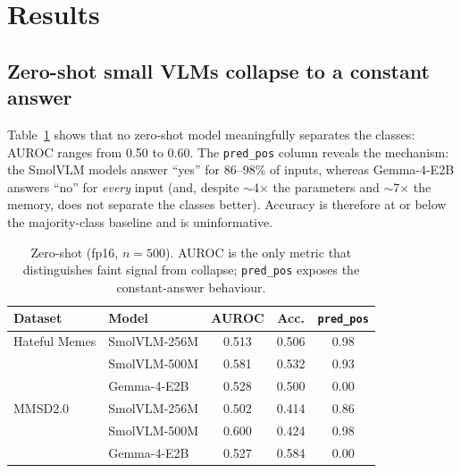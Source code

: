 \documentclass[sigconf,nonacm]{acmart}
\begin{document}
\section{Results}

\subsection{Zero-shot small VLMs collapse to a constant answer}
Table~\ref{tab:zs} shows that no zero-shot model meaningfully separates the classes:
AUROC ranges from 0.50 to 0.60. The \texttt{pred\_pos} column reveals the mechanism:
the SmolVLM models answer ``yes'' for 86--98\% of inputs, whereas Gemma-4-E2B answers
``no'' for \emph{every} input (and, despite $\sim$4$\times$ the parameters and $\sim$7$\times$
the memory, does not separate the classes better). Accuracy is therefore at or below the
majority-class baseline and is uninformative.

\begin{table}[t]
\centering
\caption{Zero-shot (fp16, $n{=}500$). AUROC is the only metric that distinguishes faint
signal from collapse; \texttt{pred\_pos} exposes the constant-answer behaviour.}
\label{tab:zs}
\begin{tabular}{llccc}
\toprule
Dataset & Model & AUROC & Acc. & \texttt{pred\_pos} \\
\midrule
Hateful Memes & SmolVLM-256M & 0.513 & 0.506 & 0.98 \\
              & SmolVLM-500M & 0.581 & 0.532 & 0.93 \\
              & Gemma-4-E2B  & 0.528 & 0.500 & 0.00 \\
\midrule
MMSD2.0       & SmolVLM-256M & 0.502 & 0.414 & 0.86 \\
              & SmolVLM-500M & 0.600 & 0.424 & 0.98 \\
              & Gemma-4-E2B  & 0.527 & 0.584 & 0.00 \\
\bottomrule
\end{tabular}
\end{table}
\end{document}
